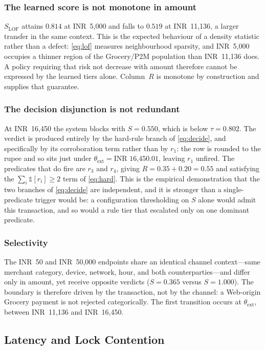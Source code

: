 \documentclass[conference]{IEEEtran}
\newcommand{\INR}[1]{\mbox{INR~#1}}
\begin{document}
\subsubsection{The learned score is not monotone in amount}
$S_{\mathrm{LOF}}$ attains $0.814$ at \INR{5{,}000} and falls to
$0.519$ at \INR{11{,}136}, a larger transfer in the same context. This
is the expected behaviour of a density statistic rather than a defect:
\eqref{eq:lof} measures neighbourhood sparsity, and \INR{5{,}000}
occupies a thinner region of the Grocery/P2M population than
\INR{11{,}136} does. A policy requiring that risk not decrease with
amount therefore cannot be expressed by the learned tiers alone.
Column~$R$ is monotone by construction and supplies that guarantee.

\subsubsection{The decision disjunction is not redundant}
At \INR{16{,}450} the system blocks with $S = 0.550$, which is below
$\tau = 0.802$. The verdict is produced entirely by the hard-rule
branch of \eqref{eq:decide}, and specifically by its corroboration
term rather than by $r_{1}$: the row is rounded to the rupee and so
sits just under $\theta_{\mathrm{ext}} = \INR{16{,}450.01}$, leaving
$r_{1}$ unfired. The predicates that do fire are $r_{3}$ and $r_{4}$,
giving $R = 0.35 + 0.20 = 0.55$ and satisfying the
$\sum_{i}\mathbb{1}[r_{i}] \geq 2$ term of \eqref{eq:hard}. This is
the empirical demonstration that the two branches of
\eqref{eq:decide} are independent, and it is stronger than a
single-predicate trigger would be: a configuration thresholding on $S$
alone would admit this transaction, and so would a rule tier that
escalated only on one dominant predicate.

\subsubsection{Selectivity}
The \INR{50} and \INR{50{,}000} endpoints share an identical channel
context---same merchant category, device, network, hour, and both
counterparties---and differ only in amount, yet receive opposite
verdicts ($S=0.365$ versus $S=1.000$). The boundary is therefore
driven by the transaction, not by the channel: a Web-origin Grocery
payment is not rejected categorically. The first transition occurs at
$\theta_{\mathrm{ext}}$, between \INR{11{,}136} and \INR{16{,}450}.

\subsection{Latency and Lock Contention}
\label{subsec:latency}
\end{document}
